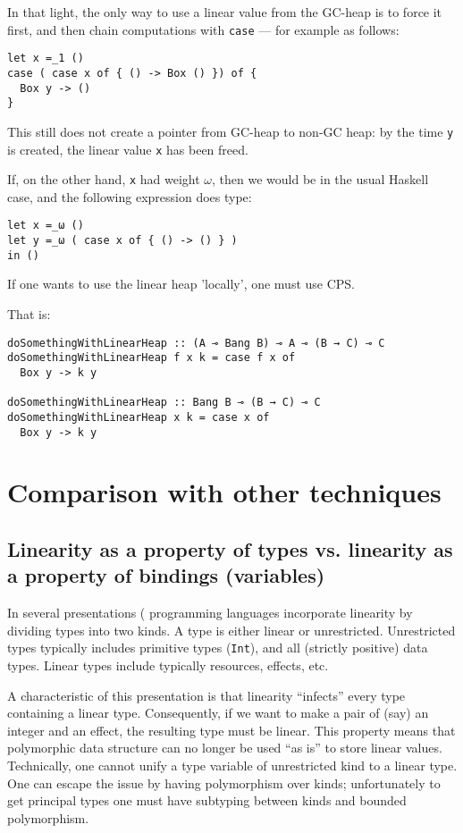 \documentclass[11pt]{article}
\begin{document}
In that light, the only way to use a linear value from the GC-heap is
to force it first, and then chain computations with \verb|case| --- for
example as follows:
\begin{verbatim}
let x =_1 ()
case ( case x of { () -> Box () }) of {
  Box y -> ()
}
\end{verbatim}
This still does not create a pointer from GC-heap to non-GC heap: by the
time \verb|y| is created, the linear value \verb|x| has been freed.

If, on the other hand, \verb|x| had weight $ω$, then we would be in the
usual Haskell case, and the following expression does type:
\begin{verbatim}
let x =_ω ()
let y =_ω ( case x of { () -> () } )
in ()
\end{verbatim}

If one wants to use the linear heap 'locally', one must use CPS.

That is:

\begin{verbatim}
doSomethingWithLinearHeap :: (A ⊸ Bang B) ⊸ A ⊸ (B → C) ⊸ C
doSomethingWithLinearHeap f x k = case f x of
  Box y -> k y

doSomethingWithLinearHeap :: Bang B ⊸ (B → C) ⊸ C
doSomethingWithLinearHeap x k = case x of
  Box y -> k y
\end{verbatim}

\section{Comparison with other techniques}

\subsection{Linearity as a property of types vs. linearity as a property of bindings (variables)}

In several presentations (\cite{wadler_linear_1990,mazurak_lightweight_2010,morris_best_2016}
programming languages incorporate
linearity by dividing types into two kinds. A type is either linear
or unrestricted. Unrestricted types typically includes primitive types
(\texttt{Int}), and all (strictly positive) data types. Linear types
include typically resources, effects, etc.

A characteristic of this presentation is that linearity ``infects''
every type containing a linear type. Consequently, if we want to make
a pair of (say) an integer and an effect, the resulting type must be
linear. This property means that polymorphic data structure can no
longer be used ``as is'' to store linear values. Technically, one
cannot unify a type variable of unrestricted kind to a linear
type. One can escape the issue by having polymorphism over kinds;
unfortunately to get principal types one must have subtyping between
kinds and bounded polymorphism.
\end{document}
